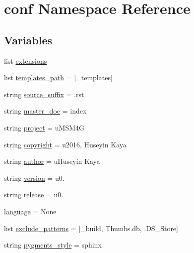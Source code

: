 \hypertarget{namespaceconf}{}\section{conf Namespace Reference}
\label{namespaceconf}
\subsection*{Variables}
\begin{DoxyCompactItemize}
\item 
list \hyperlink{namespaceconf_ac2adb9cb4fae2807baaf6a3fb59cbebb}{extensions}
\item 
list \hyperlink{namespaceconf_af5fc85fd05db5329f792629094fdd12c}{templates\+\_\+path} = \mbox{[}\textquotesingle{}\+\_\+templates\textquotesingle{}\mbox{]}
\item 
string \hyperlink{namespaceconf_ab5a6e10918566e45dfbea4f058e904f9}{source\+\_\+suffix} = \textquotesingle{}.rst\textquotesingle{}
\item 
string \hyperlink{namespaceconf_a87edce364655e617d4eea122c1c5db0a}{master\+\_\+doc} = \textquotesingle{}index\textquotesingle{}
\item 
string \hyperlink{namespaceconf_a0af1c0d59538118611a1d7a6d8b45956}{project} = u\textquotesingle{}M\+S\+M4G\textquotesingle{}
\item 
string \hyperlink{namespaceconf_a6ad5f3290c14149f679301b770fa13f9}{copyright} = u\textquotesingle{}2016, Huseyin Kaya\textquotesingle{}
\item 
string \hyperlink{namespaceconf_ab873cebb3b7e47db4fe59837d1aaa210}{author} = u\textquotesingle{}Huseyin Kaya\textquotesingle{}
\item 
string \hyperlink{namespaceconf_af9c8593b58583463efe6932e24c9d6e6}{version} = u\textquotesingle{}0.\textquotesingle{}
\item 
string \hyperlink{namespaceconf_a82643d1a47993da158506ac788f70fc4}{release} = u\textquotesingle{}0.\textquotesingle{}
\item 
\hyperlink{namespaceconf_aa37aa8979934d47ac32fd96ecff32202}{language} = None
\item 
list \hyperlink{namespaceconf_a16535c83d9b5c141382335d79b4995b2}{exclude\+\_\+patterns} = \mbox{[}\textquotesingle{}\+\_\+build\textquotesingle{}, \textquotesingle{}Thumbs.\+db\textquotesingle{}, \textquotesingle{}.D\+S\+\_\+\+Store\textquotesingle{}\mbox{]}
\item 
string \hyperlink{namespaceconf_a55caf0e3a3760b53be9bc254d13dfbf2}{pygments\+\_\+style} = \textquotesingle{}sphinx\textquotesingle{}

\end{DoxyCompactItemize}
